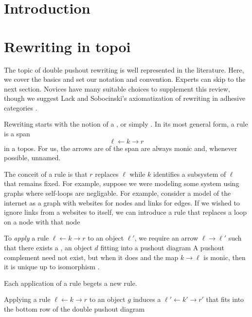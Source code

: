 \documentclass{amsart}
\begin{document}


\section{Introduction}
\label{sec:Intro}


\section{Rewriting in topoi}
\label{sec:RewriteTopoi}

The topic of double pushout rewriting is well represented in
the literature. Here, we cover the basics and set our
notation and convention. Experts can skip to the next
section. Novices have many suitable choices to supplement
this review, though we suggest Lack and Sobocinski's
axiomatization of rewriting in adhesive categories
\cite{LackSobo_Adhesive}.

Rewriting starts with the notion of a , or
simply . In its most general form, a rule is a span
\[
  \ell \gets k \to r
\]
in a topos. For us, the arrows are of the span are always
monic and, whenever possible, unnamed.

The conceit of a rule is that $ r $ replaces $ \ell $ while
$ k $ identifies a subsystem of $ \ell $ that remains
fixed. For example, suppose we were modeling some system
using graphs where self-loops are negligable. For example,
consider a model of the internet as a graph with websites
for nodes and links for edges. If we wished to ignore links
from a websites to itself, we can introduce a rule
that replaces a loop on a node with that node


To \emph{apply} a rule $ \ell \gets k \to r $ to an object
$ \ell' $, we require an arrow $ \ell \to \ell' $ such that
there exists a , an object $ d $
fitting into a pushout diagram  
A pushout complement need not exist, but when it does and
the map $ k \to \ell $ is monic, then it is unique up to
isomorphism \cite[Lem.~15]{LackSobo_Adhesive}.

Each application of a rule begets a new rule.

\begin{definition} \label{def:derived-rule}
  Applying a rule $ \ell \gets k \to r $ to an object $ g $
  induces a  $ \ell' \gets k' \to r' $ that
  fits into the bottom row of the double pushout diagram
  
\end{definition}
\end{document}
